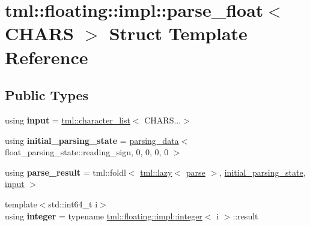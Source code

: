\hypertarget{structtml_1_1floating_1_1impl_1_1parse__float}{\section{tml\+:\+:floating\+:\+:impl\+:\+:parse\+\_\+float$<$ C\+H\+A\+R\+S $>$ Struct Template Reference}
\label{structtml_1_1floating_1_1impl_1_1parse__float}
}
\subsection*{Public Types}
\begin{DoxyCompactItemize}
\item 
\hypertarget{structtml_1_1floating_1_1impl_1_1parse__float_ac60b586687c0965aea6044931ca6dc2d}{using {\bfseries input} = \hyperlink{structtml_1_1list}{tml\+::character\+\_\+list}$<$ C\+H\+A\+R\+S...$>$}\label{structtml_1_1floating_1_1impl_1_1parse__float_ac60b586687c0965aea6044931ca6dc2d}

\item 
\hypertarget{structtml_1_1floating_1_1impl_1_1parse__float_af68640bf1a7f113b00414293c2190cc2}{using {\bfseries initial\+\_\+parsing\+\_\+state} = \hyperlink{structtml_1_1floating_1_1impl_1_1parsing__data}{parsing\+\_\+data}$<$ float\+\_\+parsing\+\_\+state\+::reading\+\_\+sign, 0, 0, 0, 0 $>$}\label{structtml_1_1floating_1_1impl_1_1parse__float_af68640bf1a7f113b00414293c2190cc2}

\item 
\hypertarget{structtml_1_1floating_1_1impl_1_1parse__float_a0fa29ecf6fc0d676e2f7578febde9751}{using {\bfseries parse\+\_\+result} = tml\+::foldl$<$ \hyperlink{structtml_1_1lazy}{tml\+::lazy}$<$ \hyperlink{structtml_1_1floating_1_1impl_1_1parse}{parse} $>$, \hyperlink{structtml_1_1floating_1_1impl_1_1parsing__data}{initial\+\_\+parsing\+\_\+state}, \hyperlink{structtml_1_1list}{input} $>$}\label{structtml_1_1floating_1_1impl_1_1parse__float_a0fa29ecf6fc0d676e2f7578febde9751}

\item 
\hypertarget{structtml_1_1floating_1_1impl_1_1parse__float_a5977c59dfaccf62e439cec1e2f4f66b9}{{\footnotesize template$<$std\+::int64\+\_\+t i$>$ }\\using {\bfseries integer} = typename \hyperlink{structtml_1_1floating_1_1impl_1_1integer}{tml\+::floating\+::impl\+::integer}$<$ i $>$\+::result}\label{structtml_1_1floating_1_1impl_1_1parse__float_a5977c59dfaccf62e439cec1e2f4f66b9}


\end{DoxyCompactItemize}
